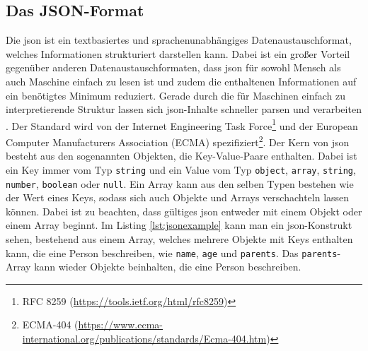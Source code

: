 \subsection{Das JSON-Format}
Die \ac{json} ist ein textbasiertes und sprachenunabhängiges Datenaustauschformat, welches Informationen strukturiert darstellen kann.
Dabei ist ein großer Vorteil gegenüber anderen Datenaustauschformaten, dass \ac{json} für sowohl Mensch als auch Maschine einfach zu lesen ist und zudem die enthaltenen Informationen auf ein benötigtes Minimum reduziert.
Gerade durch die für Maschinen einfach zu interpretierende Struktur lassen sich \ac{json}-Inhalte schneller parsen und verarbeiten \parencite{WYS2014}.
Der Standard wird von der Internet Engineering Task Force\footnote{RFC 8259 (\url{https://tools.ietf.org/html/rfc8259})} und der European Computer Manufacturers Association (ECMA) spezifiziert\footnote{ECMA-404 (\url{https://www.ecma-international.org/publications/standards/Ecma-404.htm})}.\pbreak%
%
Der Kern von \ac{json} besteht aus den sogenannten Objekten, die Key-Value-Paare enthalten.
Dabei ist ein Key immer vom Typ \texttt{string} und ein Value vom Typ \texttt{object}, \texttt{array}, \texttt{string}, \texttt{number}, \texttt{boolean} oder \texttt{null}.
Ein Array kann aus den selben Typen bestehen wie der Wert eines Keys, sodass sich auch Objekte und Arrays verschachteln lassen können.
Dabei ist zu beachten, dass gültiges \ac{json} entweder mit einem Objekt oder einem Array beginnt.
Im Listing \ref{lst:jsonexample} kann man ein \ac{json}-Konstrukt sehen, bestehend aus einem Array, welches mehrere Objekte mit Keys enthalten kann, die eine Person beschreiben, wie \texttt{name}, \texttt{age} und \texttt{parents}.
Das \texttt{parents}-Array kann wieder Objekte beinhalten, die eine Person beschreiben.

